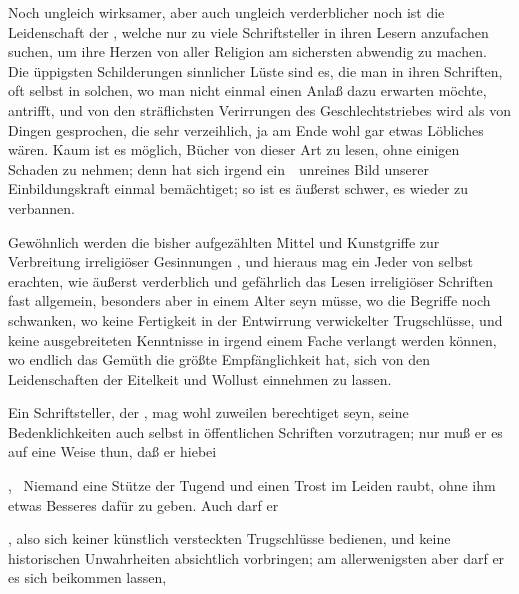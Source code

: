 \begin{aufza}
\begin{aufzb}
\begin{aufzc}
\item Noch ungleich wirksamer, aber auch ungleich verderblicher noch ist die Leidenschaft der , welche nur zu viele Schriftsteller in ihren Lesern anzufachen suchen, um ihre Herzen von aller Religion am sichersten abwendig zu machen. Die üppigsten Schilderungen sinnlicher Lüste sind es, die man in ihren Schriften, oft selbst in solchen, wo man nicht einmal einen Anlaß dazu erwarten möchte, antrifft, und von den sträflichsten Verirrungen des Geschlechtstriebes wird als von Dingen gesprochen, die sehr verzeihlich, ja am Ende wohl gar etwas Löbliches wären. Kaum ist es möglich, Bücher von dieser Art zu lesen, ohne einigen Schaden zu nehmen; denn hat sich irgend ein~\ unreines Bild unserer Einbildungskraft einmal bemächtiget; so ist es äußerst schwer, es wieder zu verbannen.
\end{aufzc}
\item Gewöhnlich werden die bisher aufgezählten Mittel und Kunstgriffe zur Verbreitung irreligiöser Gesinnungen , und hieraus mag ein Jeder von selbst erachten, wie äußerst verderblich und gefährlich das Lesen irreligiöser Schriften fast allgemein, besonders aber in einem Alter seyn müsse, wo die Begriffe noch schwanken, wo keine Fertigkeit in der Entwirrung verwickelter Trugschlüsse, und keine ausgebreiteten Kenntnisse in irgend einem Fache verlangt werden können, wo endlich das Gemüth die größte Empfänglichkeit hat, sich von den Leidenschaften der Eitelkeit und Wollust einnehmen zu lassen.
\end{aufzb}
\item Ein Schriftsteller, der , mag wohl zuweilen berechtiget seyn, seine Bedenklichkeiten auch selbst in öffentlichen Schriften vorzutragen; nur muß er es auf eine Weise thun, daß er hiebei
\begin{aufzb}
\item {}, \dh\ Niemand eine Stütze der Tugend und einen Trost im Leiden raubt, ohne ihm etwas Besseres dafür zu geben. Auch darf er
\item {}, also sich keiner künstlich versteckten Trugschlüsse bedienen, und keine historischen Unwahrheiten absichtlich vorbringen; am allerwenigsten aber darf er es sich beikommen lassen,

\end{aufzb}
\end{aufza}
